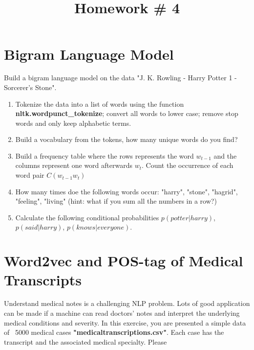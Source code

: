 \documentclass{article}
\title{Homework \#	4} %
\begin{document}
\maketitle %
\thispagestyle{fancy}
\pagestyle{fancy}%

\section{Bigram Language Model}
Build a bigram language model on the data "J. K. Rowling - Harry Potter 1 - Sorcerer's Stone". 
\begin{enumerate}[(1)]
\item Tokenize the data into a list of words using the function \textbf{nltk.wordpunct\_tokenize}; convert all words to lower case; remove stop words and only keep alphabetic terms.
\item Build a vocabulary from the tokens, how many unique words do you find?
\item Build a frequency table where the rows represents the word $w_{t-1}$ and the columns represent one word afterwards $w_{t}$. Count the occurrence of each word pair $C({w_{t-1} w_{t}})$
\item How many times doe the following words occur: "harry", "stone",  "hagrid", "feeling", "living" (hint: what if you sum all the numbers in a row?)
\item Calculate the following conditional probabilities $p(potter|harry)$, $p(said|harry)$, $p(knows|everyone)$.
\end{enumerate}


\section{Word2vec and POS-tag of Medical Transcripts} %
Understand medical notes is a challenging NLP problem. Lots of good application can be made if a machine can read doctors' notes and interpret the underlying medical conditions and severity. In this exercise, you are presented a simple data of ~5000 medical cases \textbf{"medicaltranscriptions.csv"}. Each case has the transcript and the associated medical specialty. Please 
\end{document}
